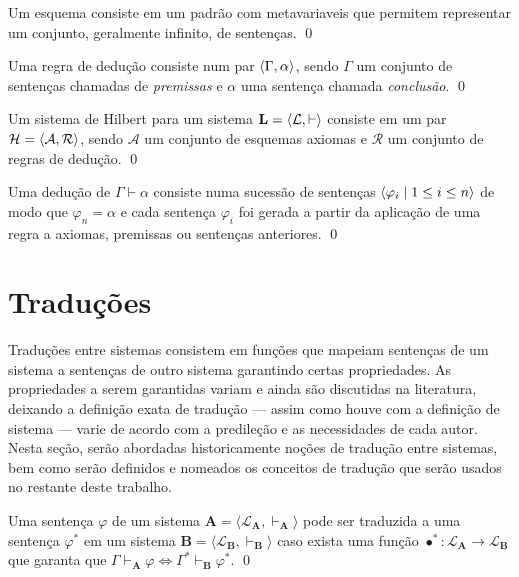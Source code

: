 \begin{definition}[Esquema]
    Um esquema consiste em um padrão com metavariaveis que permitem representar um conjunto, geralmente infinito, de sentenças.
    \qed{}
\end{definition}

\begin{definition}[Regra]
    Uma regra de dedução consiste num par $\langle\Gamma, \alpha\rangle$, sendo $\Gamma$ um conjunto de sentenças chamadas de \textit{premissas} e $\alpha$ uma sentença chamada \textit{conclusão}.
    \qed{}
\end{definition}

\begin{definition}[Axiomatização]
    Um sistema de Hilbert para um sistema $\mathbf{L} = \langle\mathcal{L}, \vdash\rangle$ consiste em um par $\mathcal{H} = \langle\mathcal{A}, \mathcal{R}\rangle$, sendo $\mathcal{A}$ um conjunto de esquemas axiomas e $\mathcal{R}$ um conjunto de regras de dedução.
    \qed{}
\end{definition}

\begin{definition}[Dedução]
    Uma dedução de $\Gamma\vdash\alpha$ consiste numa sucessão de sentenças $\langle\varphi_i\mid 1 \leq i\leq n\rangle$ de modo que $\varphi_n=\alpha$ e cada sentença $\varphi_i$ foi gerada a partir da aplicação de uma regra a axiomas, premissas ou sentenças anteriores.
    \qed{}
\end{definition}

\section{Traduções}

Traduções entre sistemas consistem em funções que mapeiam sentenças de um sistema a sentenças de outro sistema garantindo certas propriedades. As propriedades a serem garantidas variam e ainda são discutidas na literatura, deixando a definição exata de tradução --- assim como houve com a definição de sistema --- varie de acordo com a predileção e as necessidades de cada autor. Nesta seção, serão abordadas historicamente noções de tradução entre sistemas, bem como serão definidos e nomeados os conceitos de tradução que serão usados no restante deste trabalho.

\begin{definition}[Tradução] 
    Uma sentença $\varphi$ de um sistema $\mathbf{A} = \langle \mathcal{L}_\mathbf{A}, \vdash_\mathbf{A}\rangle$ pode ser traduzida a uma sentença $\varphi^*$ em um sistema $\mathbf{B} = \langle \mathcal{L}_\mathbf{B}, \vdash_\mathbf{B} \rangle$ caso exista uma função $\bullet^* : \mathcal{L}_\mathbf{A} \to \mathcal{L}_\mathbf{B}$ que garanta que $\Gamma \vdash_\mathbf{A} \varphi \Leftrightarrow \Gamma^* \vdash_\mathbf{B} \varphi^*$.
    \qed{}
\end{definition}

